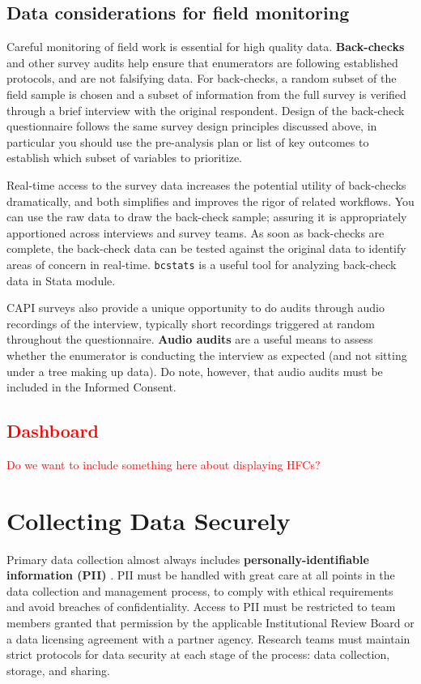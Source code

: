 \subsection{Data considerations for field monitoring}
Careful monitoring of field work is essential for high quality data.
\textbf{Back-checks} and other survey audits help ensure that enumerators are following established protocols, and are not falsifying data.
For back-checks, a random subset of the field sample is chosen and a subset of information from the full survey is verified through a brief interview with the original respondent.
Design of the back-check questionnaire follows the same survey design 
principles discussed above, in particular you should use the pre-analysis plan 
or list of key outcomes to establish which subset of variables to prioritize.

Real-time access to the survey data increases the potential utility of 
back-checks dramatically, and both simplifies and improves the rigor of related 
workflows.
You can use the raw data to draw the back-check sample; assuring it is 
appropriately apportioned across interviews and survey teams.
As soon as back-checks are complete, the back-check data can be tested against 
the original data to identify areas of concern in real-time.
\texttt{bcstats} is a useful tool for analyzing back-check data in Stata module. 

CAPI surveys also provide a unique opportunity to do audits through audio recordings of the interview, typically short recordings triggered at random throughout the questionnaire.
\textbf{Audio audits} are a useful means to assess whether the enumerator is conducting the interview as expected (and not sitting under a tree making up data).
Do note, however, that audio audits must be included in the Informed Consent.

\textcolor{red}{
\subsection{Dashboard}
Do we want to include something here about displaying HFCs? }


\section{Collecting Data Securely}
Primary data collection almost always includes  \textbf{personally-identifiable information (PII)}
.
PII must be handled with great care at all points in the data collection and management process, to comply with ethical requirements and avoid breaches of confidentiality. Access to PII must be restricted to team members granted that permission by the applicable Institutional Review Board or a data licensing agreement with a partner agency. Research teams must maintain strict protocols for data security at each stage of the process: data collection, storage, and sharing.

